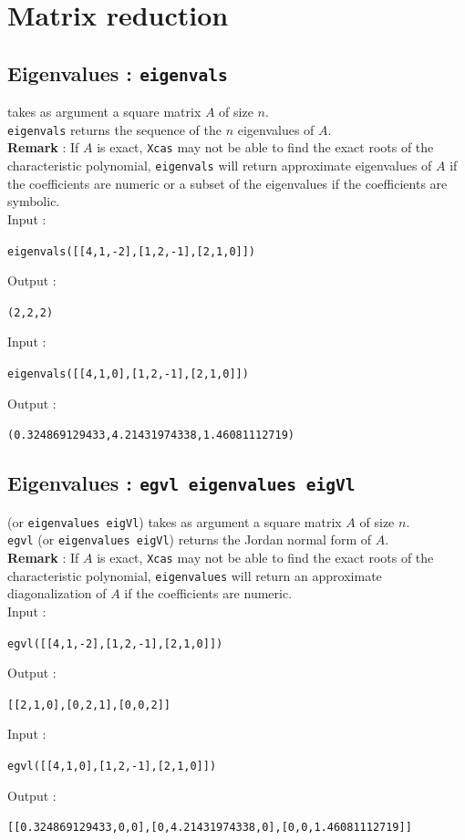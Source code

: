 \documentclass[a4paper,11pt]{book}
\begin{document}
\section{Matrix reduction}
\subsection{Eigenvalues : {\tt eigenvals}}
 takes as argument a square
matrix $A$ of size $n$.\\
{\tt eigenvals} returns the sequence of the $n$ eigenvalues of $A$.\\
{\bf Remark} : If $A$ is exact, {\tt Xcas} may not be able
to find the exact roots of the characteristic polynomial, 
{\tt eigenvals} will return approximate eigenvalues of $A$ if the
coefficients are numeric or a subset of the eigenvalues if the
coefficients are symbolic.\\
Input :
\begin{center}{\tt eigenvals([[4,1,-2],[1,2,-1],[2,1,0]])}\end{center}
Output :
\begin{center}{\tt (2,2,2) }\end{center}
Input :
\begin{center}{\tt eigenvals([[4,1,0],[1,2,-1],[2,1,0]])}\end{center}
Output :
\begin{center}{\tt (0.324869129433,4.21431974338,1.46081112719)}\end{center}

\subsection{Eigenvalues : {\tt egvl eigenvalues eigVl}}
 (or {\tt eigenvalues eigVl}) takes as argument a 
square matrix $A$ of size $n$.\\
{\tt egvl} (or {\tt eigenvalues eigVl}) returns the Jordan normal
form of $A$.\\
{\bf Remark} : If $A$ is exact, {\tt Xcas} may not be able
to find the exact roots of the characteristic polynomial, 
{\tt eigenvalues} will return an approximate diagonalization of $A$ if the
coefficients are numeric.\\
Input :
\begin{center}{\tt egvl([[4,1,-2],[1,2,-1],[2,1,0]])}\end{center}
Output :
\begin{center}{\tt [[2,1,0],[0,2,1],[0,0,2]] }\end{center}
Input :
\begin{center}{\tt egvl([[4,1,0],[1,2,-1],[2,1,0]])}\end{center}
Output :
\begin{center}{\tt [[0.324869129433,0,0],[0,4.21431974338,0],[0,0,1.46081112719]]}\end{center}
\end{document}
